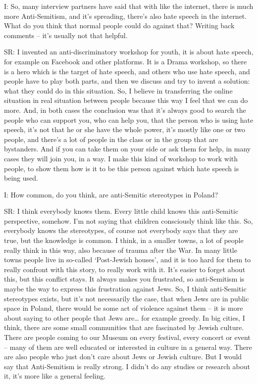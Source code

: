  

I: So, many interview partners have said that with like the internet, there is much more Anti-Semitism, and it’s spreading, there’s also hate speech in the internet. What do you think that normal people could do against that? Writing back comments – it’s usually not that helpful. 

 

SR: I invented an anti-discriminatory workshop for youth, it is about hate speech, for example on Facebook and other platforms. It is a Drama workshop, so there is a hero which is the target of hate speech, and others who use hate speech, and people have to play both parts, and then we discuss and try to invent a solution: what they could do in this situation. So, I believe in transferring the online situation in real situation between people because this way I feel that we can do more. And, in both cases the conclusion was that it’s always good to search the people who can support you, who can help you, that the person who is using hate speech, it’s not that he or she have the whole power, it’s mostly like one or two people, and there’s a lot of people in the class or in the group that are bystanders. And if you can take them on your side or ask them for help, in many cases they will join you, in a way. I make this kind of workshop to work with people, to show them how is it to be this person against which hate speech is being used. 

 

I: How common, do you think, are anti-Semitic stereotypes in Poland? 

 

SR: I think everybody knows them. Every little child knows this anti-Semitic perspective, somehow. I’m not saying that children consciously think like this. So, everybody knows the stereotypes, of course not everybody says that they are true, but the knowledge is common. I think, in a smaller towns, a lot of people really think in this way, also because of trauma after the War. In many little towns people live in so-called ‘Post-Jewish houses’,  and it is too hard for them to really confront with this story, to really work with it. It’s easier to forget about this, but this conflict stays. It always makes you frustrated, so anti-Semitism is maybe the way to express this frustration against Jews. So, I think anti-Semitic stereotypes exists, but it’s not necessarily the case, that  when Jews are in public space in Poland, there would be some act of violence against them – it is more about saying to other people that Jews are… for example greedy. In big cities, I think, there are some small communities that are  fascinated by Jewish culture. There are people coming to our Museum on every festival, every concert or event – many of them are well educated or interested in culture in a general way. There are also people who just don’t care about Jews or Jewish culture. But I would say that Anti-Semitism is really strong. I didn’t do any studies or research about it, it’s more like a general feeling. 

